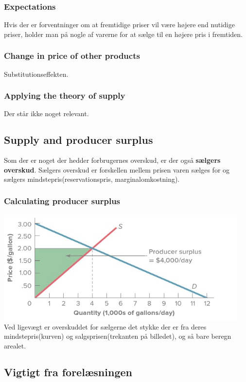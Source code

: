 \subsubsection{Expectations}
Hvis der er forventninger om at fremtidige priser vil være højere end nutidige priser, holder man på nogle af varerne for at sælge til en højere pris i fremtiden.
\subsubsection{Change in price of other products}
Substitutionseffekten.

\subsubsection{Applying the theory of supply}
Der står ikke noget relevant.

\subsection{Supply and producer surplus}
Som der er noget der hedder forbrugernes overskud, er der også \textbf{sælgers overskud}. Sælgers overskud er forskellen mellem prisen varen sælges for og sælgers mindstepris(reservationspris, marginalomkostning). 

\subsubsection{Calculating producer surplus}
\includegraphics[scale=0.8]{Afsnit/Lektion2/selgeroverskud.png}
Ved ligevægt er overskuddet for sælgerne det stykke der er fra deres mindstepris(kurven) og salgsprisen(trekanten på billedet), og så bare beregn arealet. 


\subsection{Vigtigt fra forelæsningen}

